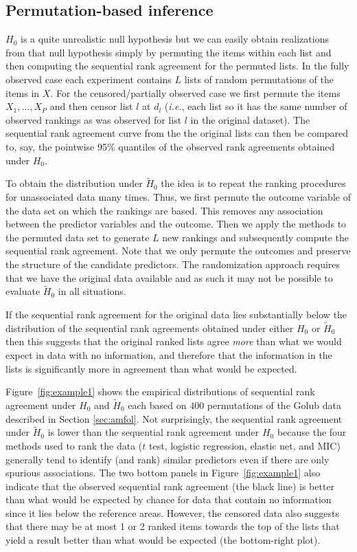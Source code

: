 \documentclass[12pt,a4paper]{article}
\makeatletter
\newcommand{\ie}{\emph{i.e.}\@\xspace}
\theoremstyle{plain}
\makeatother
\begin{document}
\subsection{Permutation-based inference}

$H_0$ is a quite unrealistic null hypothesis but we can easily obtain
realizations from that null hypothesis simply by permuting the items
within each list and then computing the sequential rank agreement for
the permuted lists. In the fully observed case each experiment
contains $L$ lists of random permutations of the items in $X$. For the
censored/partially observed case we first permute the items
$X_1,\dots,X_P$ and then censor list $l$ at $d_l$ (\ie, each list so
it has the same number of observed rankings as was observed for list
$l$ in the original dataset). The sequential rank agreement curve from
the the original lists can then be compared to, say, the pointwise
95\% quantiles of the observed rank agreements obtained under $H_0$.

To obtain the distribution under $\widetilde H_0$ the idea is to
repeat the ranking procedures for unassociated data many times.  Thus,
we first permute the outcome variable of the data set on which the
rankings are based. This removes any association between the predictor
variables and the outcome. Then we apply the methods to the permuted
data set to generate $L$ new rankings and subsequently compute the
sequential rank agreement. Note that we only permute the outcomes and
preserve the structure of the candidate predictors. The randomization
approach requires that we have the original data available and as such
it may not be possible to evaluate $\widetilde H_0$ in all situations.

If the sequential rank agreement for the original data lies
substantially below the distribution of the sequential rank agreements
obtained under either $H_0$ or $\widetilde H_0$ then this suggests that
the original ranked lists agree \emph{more} than what we would expect
in data with no information, and therefore that the information in the
lists is significantly more in agreement than what would be expected.

Figure~\ref{fig:example1} shows the empirical distributions of
sequential rank agreement under $H_0$ and $\widetilde H_0$ each based
on $400$ permutations of the Golub data described in Section
\ref{sec:amfol}. Not surprisingly, the sequential rank agreement under
$\widetilde H_0$ is lower than the sequential rank agreement under
$H_0$ because the four methods used to rank the data ($t$ test,
logistic regression, elastic net, and MIC) generally tend to identify
(and rank) similar predictors even if there are only spurious
associations. The two bottom panels in Figure~\ref{fig:example1} also
indicate that the observed sequential rank agreement (the black line)
is better than what would be expected by chance for data that contain
no information since it lies below the reference areas. However, the
censored data also suggests that there may be at most 1 or 2 ranked
items towards the top of the lists that yield a result better than
what would be expected (the bottom-right plot).
\end{document}
